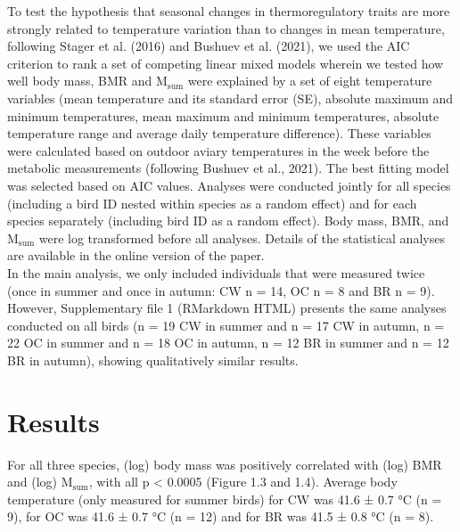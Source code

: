 \documentclass[10pt, twoside]{book} %
\begin{document}
To test the hypothesis that seasonal changes in thermoregulatory traits are more strongly related to temperature variation than to changes in mean temperature, following Stager et al. (2016) and Bushuev et al. (2021), we used the AIC criterion to rank a set of competing linear mixed models wherein we tested how well body mass, BMR and M$_{\text{sum}}$ were explained by a set of eight temperature variables (mean temperature and its standard error (SE), absolute maximum and minimum temperatures, mean maximum and minimum temperatures, absolute temperature range and average daily temperature difference). These variables were calculated based on outdoor aviary temperatures in the week before the metabolic measurements (following Bushuev et al., 2021). The best fitting model was selected based on AIC values. Analyses were conducted jointly for all species (including a bird ID nested within species as a random effect) and for each species separately (including bird ID as a random effect). Body mass, BMR, and M$_{\text{sum}}$ were log transformed before all analyses. Details of the statistical analyses are available in the online version of the paper.\\

In the main analysis, we only included individuals that were measured twice (once in summer and once in autumn: CW n = 14, OC n = 8 and BR n = 9). However, Supplementary file 1 (RMarkdown HTML) presents the same analyses conducted on all birds (n = 19 CW in summer and n = 17 CW in autumn, n = 22 OC in summer and n = 18 OC in autumn, n = 12 BR in summer and n = 12 BR in autumn), showing qualitatively similar results.\\

\section{Results}
\renewcommand\thesection{\arabic{chapter}.\arabic{section}}
\renewcommand{\thefigure}{\arabic{chapter}.\arabic{figure}}

For all three species, (log) body mass was positively correlated with (log) BMR and (log) M$_{\text{sum}}$, with all p < 0.0005 (Figure 1.3 and 1.4). Average body temperature (only measured for summer birds) for CW was 41.6 ± 0.7 °C (n = 9), for OC was 41.6 ± 0.7 °C (n = 12) and for BR was 41.5 ± 0.8 °C (n = 8).
\end{document}
